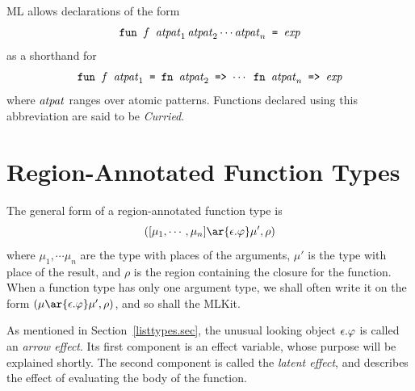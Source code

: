 \documentclass[12pt]{book}
\begin{document}
ML allows declarations of the form
%
$$\hbox{\tt fun $f$ ${\it atpat}_1\,{\it atpat}_2 \cdots {\it atpat}_n$ = $\hbox{\it exp}$}$$
as a shorthand for
$$\hbox{\tt fun $f$ ${\it atpat}_1$ = fn ${\it atpat}_2$ => $\cdots$ fn ${\it atpat}_n$
  => $\hbox{\it exp}$}$$
where ${\it atpat}$ ranges over atomic patterns.  Functions
declared using this abbreviation are said to be
%
{\em Curried}.

\section{Region-Annotated Function Types}
\label{functiontypes.sec}
The general form of a region-annotated
%
%
function type is
$$([\mu_1,\cdots,\mu_n] \ar{\epsilon.\rea} \mu', \rho)$$
where
$\mu_1,\cdots\mu_n$ are the type with places of the arguments, $\mu'$
is the type with place of the result, and $\rho$ is the region
containing the closure for the function. When a function type has only
one argument type, we shall often write it on the form $(\mu
\ar{\epsilon.\rea} \mu', \rho)$, and so shall the MLKit.

As mentioned in Section~\ref{listtypes.sec}, the unusual looking
object $\epsilon.\varphi$ is called an
%
{\em arrow effect}. Its first component
is an
%
effect variable, whose purpose will be explained shortly.  The second
component is called the
%
{\em latent effect}, and describes the effect of evaluating the body
of the function.
\end{document}
